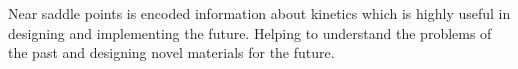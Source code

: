 Near saddle points is encoded information about kinetics which is highly useful in designing and implementing the future.
Helping to understand the problems of the past and designing novel materials for the future.





